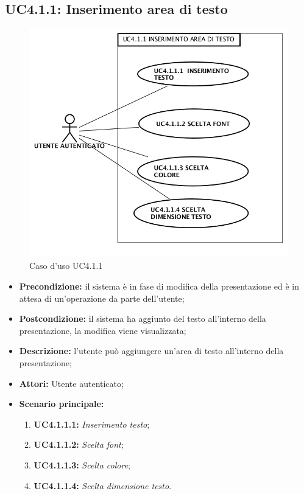 \subsection{ UC4.1.1: Inserimento area di testo}

\begin{figure}[H]
	\begin{center}
	\includegraphics[scale=0.4]{diagram/UC4-1-1.png}
	\caption{Caso d'uso UC4.1.1}
	\end{center}
\end{figure}
\begin{itemize}
	\item \textbf{Precondizione:} il sistema è in fase di modifica della presentazione ed è in attesa di un'operazione da parte dell'utente;
	\item \textbf{Postcondizione:} il sistema ha aggiunto del testo all'interno della presentazione, la modifica viene visualizzata;
	\item \textbf{Descrizione:} l'utente può aggiungere un'area di testo all'interno della presentazione;
	\item \textbf{Attori:} Utente autenticato;
	\item \textbf{Scenario principale:}
	\begin{enumerate}
		\item \textbf{ UC4.1.1.1:} \textit{ Inserimento testo};
		\item \textbf{ UC4.1.1.2:} \textit{ Scelta font};
		\item \textbf{ UC4.1.1.3:} \textit{ Scelta colore};
		\item \textbf{ UC4.1.1.4:} \textit{ Scelta dimensione testo}.
	\end{enumerate}
\end{itemize}
